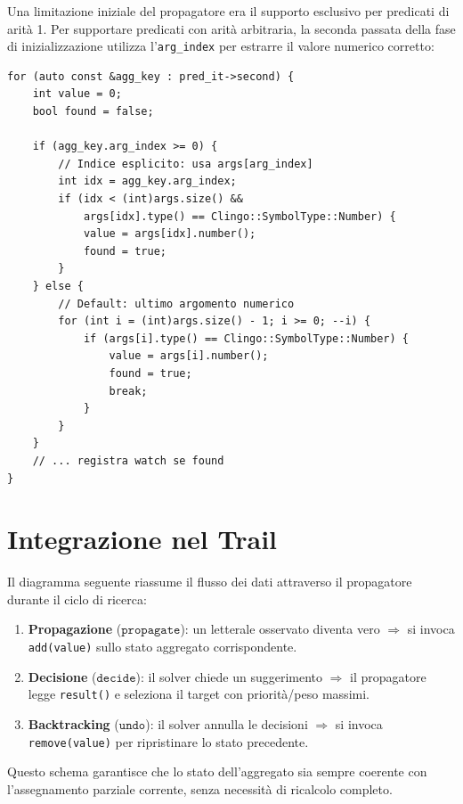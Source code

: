 \documentclass[a4paper,12pt,twoside,openright]{report}
\begin{document}
Una limitazione iniziale del propagatore era il supporto esclusivo per predicati di arità 1. Per supportare predicati con arità arbitraria, la seconda passata della fase di inizializzazione utilizza l'\texttt{arg\_index} per estrarre il valore numerico corretto:

\begin{lstlisting}[style=cppstyle,caption={Estrazione del valore da predicati n-ari}]
for (auto const &agg_key : pred_it->second) {
    int value = 0;
    bool found = false;

    if (agg_key.arg_index >= 0) {
        // Indice esplicito: usa args[arg_index]
        int idx = agg_key.arg_index;
        if (idx < (int)args.size() &&
            args[idx].type() == Clingo::SymbolType::Number) {
            value = args[idx].number();
            found = true;
        }
    } else {
        // Default: ultimo argomento numerico
        for (int i = (int)args.size() - 1; i >= 0; --i) {
            if (args[i].type() == Clingo::SymbolType::Number) {
                value = args[i].number();
                found = true;
                break;
            }
        }
    }
    // ... registra watch se found
}
\end{lstlisting}

\section{Integrazione nel Trail}

Il diagramma seguente riassume il flusso dei dati attraverso il propagatore durante il ciclo di ricerca:

\begin{enumerate}
    \item \textbf{Propagazione} ($\texttt{propagate}$): un letterale osservato diventa vero $\Rightarrow$ si invoca \texttt{add(value)} sullo stato aggregato corrispondente.
    \item \textbf{Decisione} ($\texttt{decide}$): il solver chiede un suggerimento $\Rightarrow$ il propagatore legge \texttt{result()} e seleziona il target con priorit\`{a}/peso massimi.
    \item \textbf{Backtracking} ($\texttt{undo}$): il solver annulla le decisioni $\Rightarrow$ si invoca \texttt{remove(value)} per ripristinare lo stato precedente.
\end{enumerate}

Questo schema garantisce che lo stato dell'aggregato sia sempre coerente con l'assegnamento parziale corrente, senza necessit\`{a} di ricalcolo completo.
\end{document}
